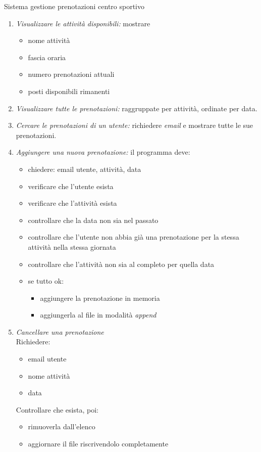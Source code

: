 \begin{esercizioL}{Sistema gestione prenotazioni centro sportivo}
\begin{enumerate}
		\item \textit{Visualizzare le attività disponibili:} mostrare
		      \begin{itemize}
			      \item nome attività
			      \item fascia oraria
			      \item numero prenotazioni attuali
			      \item posti disponibili rimanenti
		      \end{itemize}

		\item \textit{Visualizzare tutte le prenotazioni:} raggruppate per attività, ordinate per data.

		\item \textit{Cercare le prenotazioni di un utente:} richiedere \textit{email} e mostrare tutte le sue prenotazioni.

		\item \textit{Aggiungere una nuova prenotazione:} il programma deve:
		      \begin{itemize}
			      \item chiedere: email utente, attività, data
			      \item verificare che l'utente esista
			      \item verificare che l'attività esista
			      \item controllare che la data non sia nel passato
			      \item controllare che l'utente non abbia già una prenotazione per la stessa attività nella stessa giornata
			      \item controllare che l'attività non sia al completo per quella data
			      \item se tutto ok:
			            \begin{itemize}
				            \item aggiungere la prenotazione in memoria
				            \item aggiungerla al file in modalità \textit{append}
			            \end{itemize}
		      \end{itemize}

		\item \textit{Cancellare una prenotazione}\\
		      Richiedere:
		      \begin{itemize}
			      \item email utente
			      \item nome attività
			      \item data
		      \end{itemize}
		      Controllare che esista, poi:
		      \begin{itemize}
			      \item rimuoverla dall'elenco
			      \item aggiornare il file riscrivendolo completamente
		      \end{itemize}


\end{enumerate}
\end{esercizioL}
